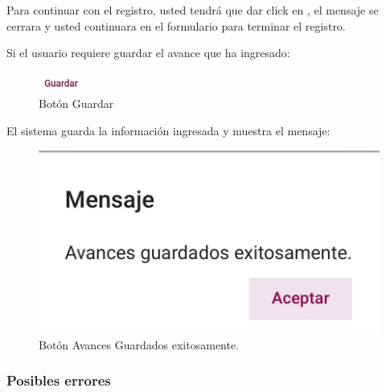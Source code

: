 Para continuar con el registro, usted tendrá que  dar click en , el mensaje se cerrara y usted continuara
en el formulario para terminar el registro.

\pagebreak
Si el usuario requiere guardar el avance que ha ingresado:

\begin{figure}[H]
    \centering
    \includegraphics[width=0.1\linewidth]{images/SP6/BotonGuardar.jpeg}
    \caption{Botón Guardar}
\end{figure}

El sistema guarda la información ingresada y muestra el mensaje:

\begin{figure}[H]
    \centering
    \includegraphics[width=0.4\linewidth]{images/SP6/BotonAvance.jpeg}
    \caption{Botón Avances Guardados exitosamente.}
\end{figure}

\subsubsection{Posibles errores}

